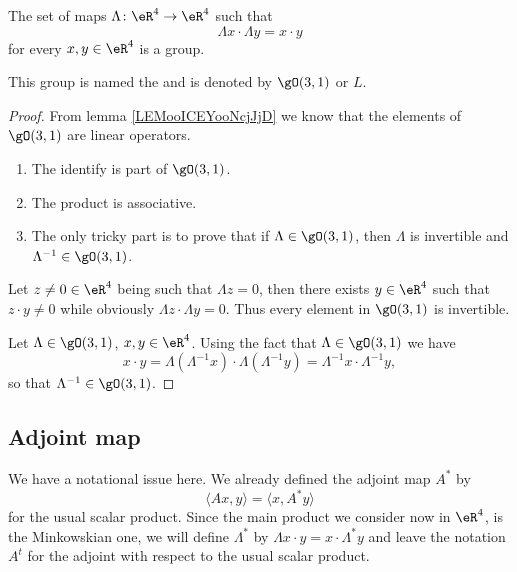 \begin{lemmaDef}
	The set of maps \( \Lambda\colon \eR^4\to \eR^4\) such that
	\begin{equation}        \label{EQooLPXWooNgrAXz}
		\Lambda x\cdot \Lambda y=x\cdot y
	\end{equation}
	for every \( x,y\in  \eR^4\) is a group.

	This group is named the  and is denoted by \( \gO(3,1)\) or \( L\).
\end{lemmaDef}

\begin{proof}
	From lemma \ref{LEMooICEYooNcjJjD} we know that the elements of \( \gO(3,1)\) are linear operators.
	\begin{enumerate}
		\item
		      The identify is part of \( \gO(3,1)\).
		\item
		      The product is associative.
		\item
		      The only tricky part is to prove that if \( \Lambda\in \gO(3,1)\), then \( \Lambda\) is invertible and \( \Lambda^{-1}\in \gO(3,1)\).
	\end{enumerate}
	Let \( z\neq 0\in \eR^4\) being such that \( \Lambda z=0\), then there exists \( y\in \eR^4\) such that \( z\cdot y\neq 0\) while obviously \( \Lambda z\cdot \Lambda y=0\). Thus every element in \(  \gO(3,1)\) is invertible.

	Let \( \Lambda\in \gO(3,1)\), \( x,y\in \eR^4\). Using the fact that \( \Lambda\in \gO(3,1)\) we have
	\begin{equation}
		x\cdot y= \Lambda(\Lambda^{-1} x)\cdot\Lambda(\Lambda^{-1}y)=\Lambda^{-1}x\cdot \Lambda^{-1}y,
	\end{equation}
	so that \( \Lambda^{-1}\in \gO(3,1)\).
\end{proof}

\subsection{Adjoint map}

We have a notational issue here. We already defined the adjoint map \( A^*\) by
\begin{equation}
	\langle Ax, y\rangle =\langle x, A^*y\rangle
\end{equation}
for the usual scalar product. Since the main product we consider now in \( \eR^4\), is the Minkowskian one, we will define \( \Lambda^*\) by \( \Lambda x\cdot y=x\cdot \Lambda^*y\) and leave the notation \( A^t\) for the adjoint with respect to the usual scalar product.

